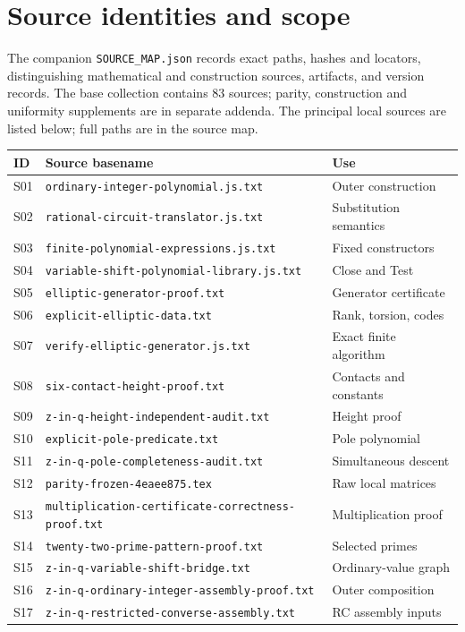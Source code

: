 \section{Source identities and scope}\label{app:sources}
The companion \texttt{SOURCE\_MAP.json} records exact paths, hashes and
locators, distinguishing mathematical and construction sources, artifacts,
and version records. The base collection contains 83 sources; parity, construction
and uniformity supplements are in separate addenda. The principal local
sources are listed below; full paths
are in the source map.
\begin{longtable}{p{}p{}p{}}
\toprule ID & Source basename & Use\\\midrule\endhead
S01 & \texttt{ordinary-integer-polynomial.js.txt} & Outer construction\\
S02 & \texttt{rational-circuit-translator.js.txt} & Substitution semantics\\
S03 & \texttt{finite-polynomial-expressions.js.txt} & Fixed constructors\\
S04 & \texttt{variable-shift-polynomial-library.js.txt} & Close and Test\\
S05 & \texttt{elliptic-generator-proof.txt} & Generator certificate\\
S06 & \texttt{explicit-elliptic-data.txt} & Rank, torsion, codes\\
S07 & \texttt{verify-elliptic-generator.js.txt} & Exact finite algorithm\\
S08 & \texttt{six-contact-height-proof.txt} & Contacts and constants\\
S09 & \texttt{z-in-q-height-independent-audit.txt} & Height proof\\
S10 & \texttt{explicit-pole-predicate.txt} & Pole polynomial\\
S11 & \texttt{z-in-q-pole-completeness-audit.txt} & Simultaneous descent\\
S12 & \texttt{parity-frozen-4eaee875.tex} & Raw local matrices\\
S13 & \nolinkurl{multiplication-certificate-correctness-proof.txt} & Multiplication proof\\
S14 & \texttt{twenty-two-prime-pattern-proof.txt} & Selected primes\\
S15 & \texttt{z-in-q-variable-shift-bridge.txt} & Ordinary-value graph\\
S16 & \texttt{z-in-q-ordinary-integer-assembly-proof.txt} & Outer composition\\
S17 & \texttt{z-in-q-restricted-converse-assembly.txt} & RC assembly inputs\\

\end{longtable}
